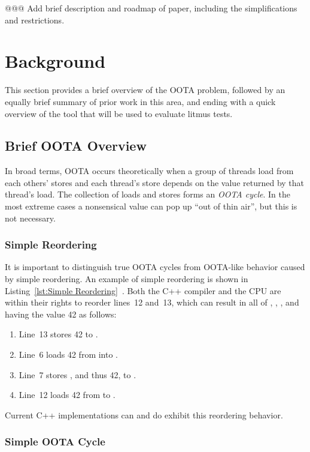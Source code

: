 \documentclass[10]{article}
\begin{document}
@@@ Add brief description and roadmap of paper, including the simplifications
and restrictions.

\section{Background}
\label{sec:Background}

This section provides a brief overview of the OOTA problem, followed
by an equally brief summary of prior work in this area, and ending
with a quick overview of the  tool that will be used to
evaluate litmus tests.

\subsection{Brief OOTA Overview}
\label{sec:Brief OOTA Overview}

In broad terms,
OOTA occurs theoretically when a group of threads load from each others' stores
and each thread's store depends on the value returned by that thread's load.
The collection of loads and stores forms an \emph{OOTA cycle}.
In the most extreme cases a nonsensical value can pop up ``out of thin air'',
but this is not necessary.

\subsubsection{Simple Reordering}
\label{sec:Simple Reordering}

It is important to distinguish true OOTA cycles from OOTA-like
behavior caused by simple reordering.
An example of simple reordering is shown in
Listing~\ref{lst:Simple Reordering}~\cite{PaulEMcKenney2020RelaxedGuideRelaxed}.
Both the C++ compiler and the CPU are within their rights to reorder
lines~12 and~13, which can result in all of , , ,
and  having the value 42 as follows:
\begin{enumerate}
\item   Line~13 stores 42 to .
\item   Line~6 loads 42 from  into .
\item   Line~7 stores , and thus 42, to .
\item   Line~12 loads 42 from  to .
\end{enumerate}
Current C++ implementations can and do exhibit this reordering behavior.

\subsubsection{Simple OOTA Cycle}
\label{sec:Simple OOTA Cycle}
\end{document}
